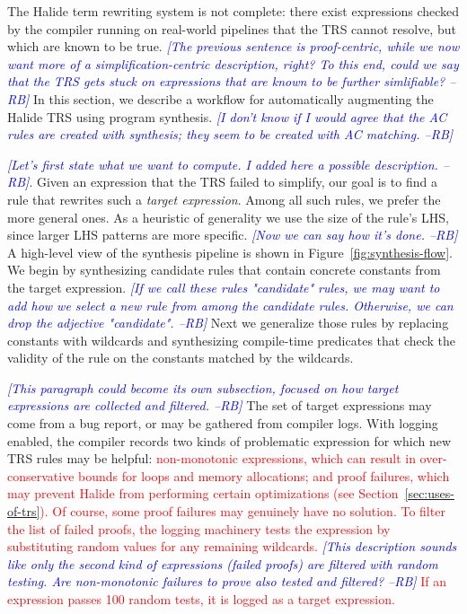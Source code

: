 \documentclass[acmsmall,review]{acmart}\settopmatter{printfolios=true,printccs=false,printacmref=false}
\newcommand{\rb}[1]{\textcolor{blue}{\textit{[{#1} --RB]}}}
\newcommand{\modified}[1]{\textcolor{red}{{#1}}}
\begin{document}
The Halide term rewriting system is not complete: there
exist expressions checked by the compiler running on real-world pipelines that
the TRS cannot resolve, but which are known to be true. 
\rb{The previous sentence is proof-centric, while we now want more of a simplification-centric description, right?  To this end, could we say that the TRS gets stuck on expressions that are known to be further simlifiable?}
In this section, we describe a workflow for automatically augmenting the Halide TRS using program synthesis. 
\rb{I don't know if I would agree that the AC rules are created with synthesis; they seem to be created with AC matching. }

\rb{Let's first state what we want to compute. I added here a possible description.}. Given an expression that the TRS failed to simplify, our goal is to find a rule that rewrites such a \emph{target expression}.  Among all such rules, we prefer the more general ones. As a heuristic of generality we use the size of the rule's LHS, since larger LHS patterns are more specific. \rb{Now we can say how it's done.} A high-level view of the synthesis pipeline is shown in Figure~\ref{fig:synthesis-flow}.
We begin by synthesizing candidate rules that contain concrete constants from the target expression.  \rb{If we call these rules "candidate" rules, we may want to add how we select a new rule from among the candidate rules. Otherwise, we can drop the adjective "candidate". }  Next we generalize those rules by replacing constants with wildcards and synthesizing compile-time predicates 
that check the validity of the rule on the constants matched by the wildcards. 


\rb{This paragraph could become its own subsection, focused on how target expressions are collected and filtered.}
The set of target expressions may come from a bug report, or may be gathered from compiler logs. With logging enabled, the compiler records two
kinds of problematic expression for which new TRS rules may be helpful:
\modified{non-monotonic expressions, which can result in over-conservative
bounds for loops and memory allocations; and proof failures,
which may prevent Halide from performing certain optimizations
(see Section~\ref{sec:uses-of-trs}). Of course, some proof failures may genuinely have
no solution. To filter the list of failed proofs,
the logging machinery tests the expression by substituting random values for any remaining wildcards.  
\rb{This description sounds like only the second kind of expressions (failed proofs) are filtered with random testing.  Are non-monotonic failures to prove also tested and filtered?} 
If an expression passes 100 random tests, it is logged as a target expression.}
\end{document}
